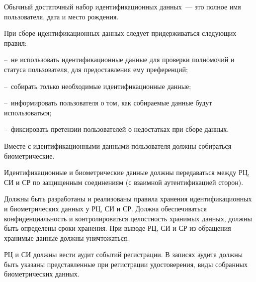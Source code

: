 \begin{note}
Обычный достаточный набор идентификационных данных~--- это 
полное имя пользователя, дата и место рождения.
\end{note}

\begin{note}
При сборе идентификационных данных следует придерживаться следующих правил: 

--~не использовать идентификационные данные для проверки полномочий 
и статуса пользователя, для предоставления ему преференций;

--~собирать только необходимые идентификационные данные;

%

--~информировать пользователя о том, как собираемые данные будут использоваться;

--~фиксировать претензии пользователей о недостатках при сборе данных.
\end{note}


Вместе с идентификационными данными пользователя должны собираться  
биометрические. 

Идентификационные и биометрические данные должны передаваться между
РЦ, СИ и СР по защищенным соединениям (с взаимной аутентификацией сторон).

Должны быть разработаны и реализованы правила хранения идентификационных 
и биометрических данных у РЦ, СИ и СР.
%
Должна обеспечиваться конфиденциальность и контролироваться целостность
хранимых данных, должны быть определены сроки хранения. 
%
При выводе РЦ, СИ и СР из обращения хранимые данные должны уничтожаться.




\label{R.UR.Audit}
РЦ и СИ должны вести аудит событий регистрации. В записях аудита 
должны быть указаны представленные при регистрации удостоверения,
виды собранных биометрических данных.



